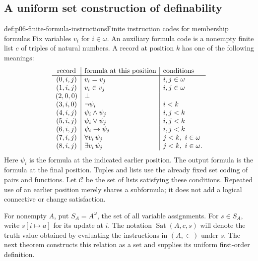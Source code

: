 \subsection{A uniform set construction of definability}

\begin{hbdefinition}{def:p06-finite-formula-instructions}{Finite instruction codes for membership formulas}
Fix variables \(v_i\) for \(i\in\omega\).  An auxiliary formula code
is a nonempty finite list \(c\) of triples of natural numbers.  A
record at position \(k\) has one of the following meanings:
\[
\begin{array}{c|l|l}
\text{record}&\text{formula at this position}&\text{conditions}\\
\hline
(0,i,j)&v_i=v_j&i,j\in\omega\\
(1,i,j)&v_i\in v_j&i,j\in\omega\\
(2,0,0)&\bot&\\
(3,i,0)&\neg\psi_i&i<k\\
(4,i,j)&\psi_i\land\psi_j&i,j<k\\
(5,i,j)&\psi_i\lor\psi_j&i,j<k\\
(6,i,j)&\psi_i\to\psi_j&i,j<k\\
(7,i,j)&\forall v_i\,\psi_j&j<k,\ i\in\omega\\
(8,i,j)&\exists v_i\,\psi_j&j<k,\ i\in\omega.
\end{array}
\]
Here \(\psi_i\) is the formula at the indicated earlier position.
The output formula is the formula at the final position.  Tuples and
lists use the already fixed set coding of pairs and functions.
Let \(\mathcal C\) be the set of lists satisfying these conditions.
Repeated use of an earlier position merely shares a subformula; it
does not add a logical connective or change satisfaction.

For nonempty \(A\), put \(S_A=A^\omega\), the set of all variable
assignments.  For \(s\in S_A\), write \(s[i\mapsto a]\) for its
update at \(i\).  The notation \(\operatorname{Sat}(A,c,s)\) will
denote the truth value obtained by evaluating the instructions in
\((A,\in)\) under \(s\).  The next theorem constructs this relation
as a set and supplies its uniform first-order definition.
\end{hbdefinition}


